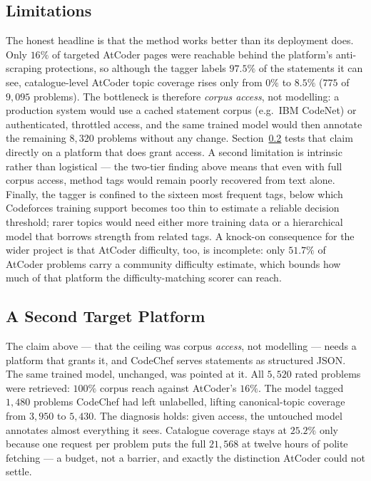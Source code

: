 \documentclass[12pt,a4paper]{article}
\begin{document}
\subsection{Limitations}
The honest headline is that the method works better than its deployment does. Only $16\%$
of targeted AtCoder pages were reachable behind the platform's anti-scraping protections,
so although the tagger labels $97.5\%$ of the statements it can see, catalogue-level
AtCoder topic coverage rises only from $0\%$ to $8.5\%$ ($775$ of $9{,}095$ problems).
The bottleneck is therefore \emph{corpus access}, not modelling: a production system
would use a cached statement corpus (e.g.\ IBM CodeNet) or authenticated, throttled
access, and the same trained model would then annotate the remaining $8{,}320$ problems
without any change. Section~\ref{sec:tagger-codechef} tests that claim directly on a
platform that does grant access. A second limitation is intrinsic rather than logistical --- the
two-tier finding above means that even with full corpus access, method tags would remain
poorly recovered from text alone. Finally, the tagger is confined to the sixteen most
frequent tags, below which Codeforces training support becomes too thin to estimate a
reliable decision threshold; rarer topics would need either more training data or a
hierarchical model that borrows strength from related tags. A knock-on consequence for
the wider project is that AtCoder difficulty, too, is incomplete: only $51.7\%$ of
AtCoder problems carry a community difficulty estimate, which bounds how much of that
platform the difficulty-matching scorer can reach.

\subsection{A Second Target Platform}
\label{sec:tagger-codechef}
The claim above --- that the ceiling was corpus \emph{access}, not modelling --- needs a
platform that grants it, and CodeChef serves statements as structured JSON. The same
trained model, unchanged, was pointed at it. All $5{,}520$ rated problems were retrieved:
$100\%$ corpus reach against AtCoder's $16\%$. The model tagged $1{,}480$ problems
CodeChef had left unlabelled, lifting canonical-topic coverage from $3{,}950$ to
$5{,}430$. The diagnosis holds: given access, the untouched model annotates almost
everything it sees. Catalogue coverage stays at $25.2\%$ only because one request per
problem puts the full $21{,}568$ at twelve hours of polite fetching --- a budget, not a
barrier, and exactly the distinction AtCoder could not settle.
\end{document}
